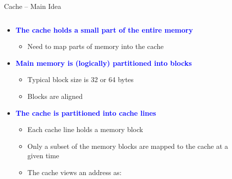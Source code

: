 \documentclass[aspectratio=169,12pt]{beamer}
\begin{document}
\begin{frame}{Cache -- Main Idea}
\begin{columns}[T]
\begin{column}{0.65\textwidth}
\begin{itemize}
  \item \textcolor{blue}{\textbf{The cache holds a small part of the entire memory}}
  \begin{itemize}
    \item Need to map parts of memory into the cache
  \end{itemize}
  
  \item \textcolor{blue}{\textbf{Main memory is (logically) partitioned into blocks}}
  \begin{itemize}
    \item Typical block size is 32 or 64 bytes
    \item Blocks are aligned
  \end{itemize}
  
  \item \textcolor{blue}{\textbf{The cache is partitioned into cache lines}}
  \begin{itemize}
    \item Each cache line holds a memory block
    \item Only a subset of the memory blocks are mapped to the cache at a given time
    \item The cache views an address as:
  \end{itemize}
\end{itemize}

\vspace{0.3cm}
\begin{center}
\end{center}
\end{column}

\begin{column}{0.35\textwidth}
\end{column}
\end{columns}
\end{frame}
\end{document}
